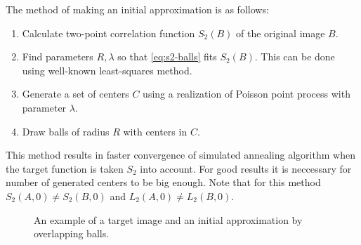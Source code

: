 \documentclass[preprint,amsmath,amssymb,aps,pre,nofootinbib]{revtex4-1}
\begin{document}
The method of making an initial approximation is as follows:
\begin{enumerate}
\item Calculate two-point correlation function $S_2(B)$ of the original image
  $B$.
\item Find parameters $R, \lambda$ so that \cref{eq:s2-balls} fits
  $S_2(B)$. This can be done using well-known least-squares method.
\item Generate a set of centers $C$ using a realization of Poisson point process
  with parameter $\lambda$.
\item Draw balls of radius $R$ with centers in $C$.
\end{enumerate}
This method results in faster convergence of simulated annealing algorithm when
the target function is taken $S_2$ into account. For good results it is
neccessary for number of generated centers to be big enough. Note that for this
method $S_2(A, 0) \ne S_2(B, 0)$ and $L_2(A, 0) \ne L_2(B, 0)$.
\begin{figure}[ht]
  \centering
  \hfill
  \caption[]{An example of a target image and an initial approximation by
    overlapping balls.}
  \label{fig:init-balls}
\end{figure}
\end{document}
